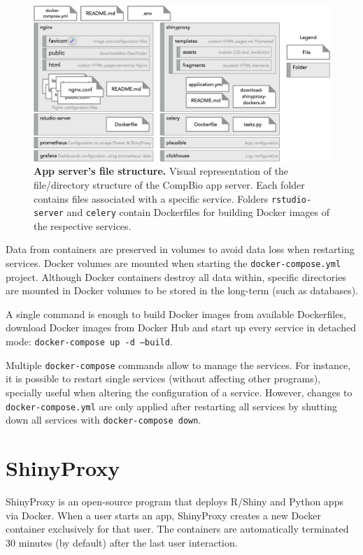 \begin{figure}[!h]
  \includegraphics[width=1\textwidth]{images/app-server/file-structure}
  \centering
  \caption[App server's file structure]{\textbf{App server's file structure.} Visual representation of the file/directory structure of the CompBio app server. Each folder contains files associated with a specific service. Folders \texttt{rstudio-server} and \texttt{celery} contain Dockerfiles for building Docker images of the respective services.}
  \label{fig:file-structure}
\end{figure}

Data from containers are preserved in volumes to avoid data loss when restarting services. Docker volumes are mounted when starting the \texttt{docker-compose.yml} project. Although Docker containers destroy all data within, specific directories are mounted in Docker volumes to be stored in the long-term (such as databases).

A single command is enough to build Docker images from available Dockerfiles, download Docker images from Docker Hub and start up every service in detached mode: \texttt{docker-compose up -d --build}.

Multiple \texttt{docker-compose} commands allow to manage the services. For instance, it is possible to restart single services (without affecting other programs), specially useful when altering the configuration of a service. However, changes to \texttt{docker-compose.yml} are only applied after restarting all services by shutting down all services with \texttt{docker-compose down}.

\section{ShinyProxy}

ShinyProxy is an open-source program that deploys R/Shiny and Python apps via Docker. When a user starts an app, ShinyProxy creates a new Docker container exclusively for that user. The containers are automatically terminated 30 minutes (by default) after the last user interaction.

